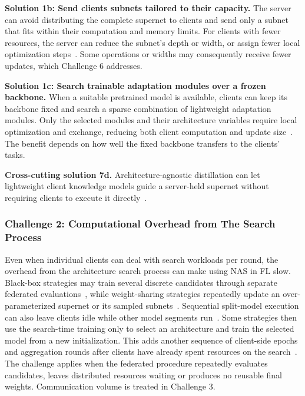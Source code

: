 \noindent\textbf{Solution 1b: Send clients subnets tailored to their capacity.} The server can avoid distributing the complete supernet to clients and send only a subnet that fits within their computation and memory limits. For clients with fewer resources, the server can reduce the subnet's depth or width, or assign fewer local optimization steps~\cite{dfnas_2020,fedoras_2022,apons_2023,divide-and-conquer_fednas_2023,peaches_2024,fgfl_2024,supernet_trade-off_fednas_2025,optimize_fednas_edge_2021,efnas_2024,load_monitoring_fednas_2025,perfedrlnas_2024,rafl_2024}. Some operations or widths may consequently receive fewer updates, which Challenge 6 addresses.

\noindent\textbf{Solution 1c: Search trainable adaptation modules over a frozen backbone.} When a suitable pretrained model is available, clients can keep its backbone fixed and search a sparse combination of lightweight adaptation modules. Only the selected modules and their architecture variables require local optimization and exchange, reducing both client computation and update size~\cite{fednaspet_2023}. The benefit depends on how well the fixed backbone transfers to the clients' tasks.

\noindent\textbf{Cross-cutting solution 7d.} Architecture-agnostic distillation can let lightweight client knowledge models guide a server-held supernet without requiring clients to execute it directly~\cite{hapfnas_2025}.

\subsubsection{Challenge 2: Computational Overhead from The Search Process}

Even when individual clients can deal with search workloads per round, the overhead from the architecture search process can make using NAS in FL slow. Black-box strategies may train several discrete candidates through separate federated evaluations~\cite{decnas_2022,rt_fed_evo_nas_2020}, while weight-sharing strategies repeatedly update an over-parameterized supernet or its sampled subnets~\cite{fednas_2021,superfednas_2024}. Sequential split-model execution can also leave clients idle while other model segments run~\cite{nasfly_2024}. Some strategies then use the search-time training only to select an architecture and train the selected model from a new initialization. This adds another sequence of client-side epochs and aggregation rounds after clients have already spent resources on the search~\cite{medical_image_segmentation_fednas_2024,privacy_preserving_fednas_for_edge_2025}. The challenge applies when the federated procedure repeatedly evaluates candidates, leaves distributed resources waiting or produces no reusable final weights. Communication volume is treated in Challenge 3.


